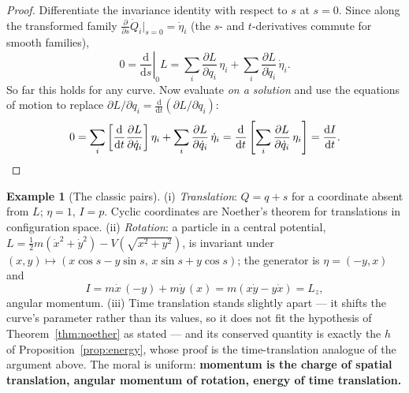 \documentclass[11pt]{article}
\theoremstyle{plain}
\theoremstyle{definition}
\newtheorem{example}[theorem]{Example}
\theoremstyle{remark}
\newcommand{\dd}{\mathrm{d}}
\newcommand{\pd}[2]{\frac{\partial #1}{\partial #2}}
\begin{document}
\begin{proof}
Differentiate the invariance identity with respect to $s$ at $s=0$. Since
along the transformed family
$\tfrac{\partial}{\partial s}\dot Q_i\big|_{s=0} = \dot\eta_i$
(the $s$- and $t$-derivatives commute for smooth families),
\begin{equation}
  0 = \left.\frac{\dd}{\dd s}\right|_{0} L
  = \sum_i \pd{L}{q_i}\,\eta_i + \sum_i \pd{L}{\dot q_i}\,\dot\eta_i .
\end{equation}
So far this holds for any curve. Now evaluate \emph{on a solution} and use
the equations of motion to replace
$\partial L/\partial q_i = \tfrac{\dd}{\dd t}(\partial L/\partial\dot q_i)$:
\begin{equation}
  0 = \sum_i \left[\frac{\dd}{\dd t}\pd{L}{\dot q_i}\right]\eta_i
    + \sum_i \pd{L}{\dot q_i}\,\dot\eta_i
  = \frac{\dd}{\dd t}\left[\sum_i \pd{L}{\dot q_i}\,\eta_i\right]
  = \frac{\dd I}{\dd t}. \qedhere
\end{equation}
\end{proof}

\begin{example}[The classic pairs]
(i) \emph{Translation}: $Q = q + s$ for a coordinate absent from $L$;
$\eta = 1$, $I = p$. Cyclic coordinates are Noether's theorem for
translations in configuration space. (ii) \emph{Rotation}: a particle in a
central potential, $L = \tfrac12 m(\dot x^2 + \dot y^2) - V(\sqrt{x^2+y^2})$,
is invariant under $(x, y) \mapsto (x\cos s - y\sin s,\, x\sin s +
y\cos s)$; the generator is $\eta = (-y, x)$ and
\begin{equation}
  I = m\dot x\,(-y) + m\dot y\,(x) = m(x\dot y - y\dot x) = L_z ,
\end{equation}
angular momentum. (iii) Time translation stands slightly apart --- it
shifts the curve's parameter rather than its values, so it does not fit
the hypothesis of Theorem~\ref{thm:noether} as stated --- and its
conserved quantity is exactly the $h$ of
Proposition~\ref{prop:energy}, whose proof is the time-translation
analogue of the argument above. The moral is
uniform: \textbf{momentum is the charge of spatial translation, angular
momentum of rotation, energy of time translation.}
\end{example}
\end{document}

